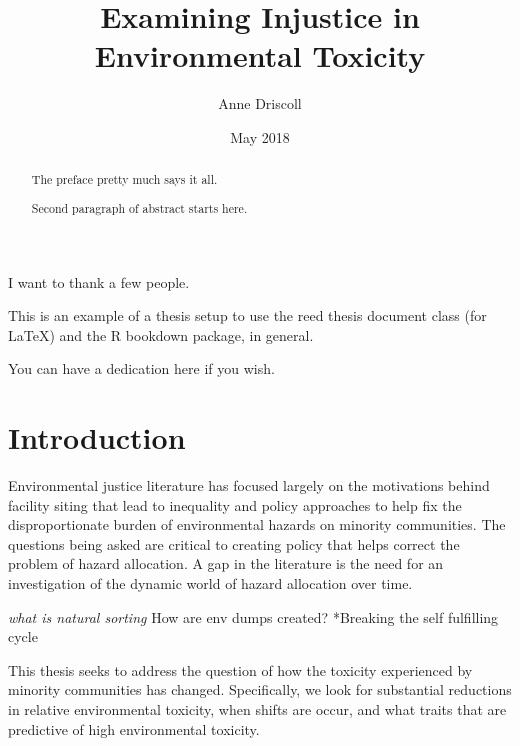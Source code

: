 \documentclass[12pt,twoside]{dukestatscithesis}
\title{Examining Injustice in Environmental Toxicity}
\author{Anne Driscoll}
\date{May 2018}
\theoremstyle{definition}
\theoremstyle{definition}
\theoremstyle{definition}
\theoremstyle{remark}
\begin{document}
  \maketitle

\frontmatter %
\pagestyle{empty} %
  \begin{acknowledgements}
    I want to thank a few people.
  \end{acknowledgements}
  \begin{preface}
    This is an example of a thesis setup to use the reed thesis document
    class (for LaTeX) and the R bookdown package, in general.
  \end{preface}
  \hypersetup{linkcolor=black}
  \setcounter{tocdepth}{2}
  \tableofcontents

  \listoftables

  \listoffigures
  \begin{abstract}
    The preface pretty much says it all. \par
    
    Second paragraph of abstract starts here.
  \end{abstract}
  \begin{dedication}
    You can have a dedication here if you wish.
  \end{dedication}
\mainmatter %
\pagestyle{fancyplain} %

\chapter*{Introduction}\label{introduction}

Environmental justice literature has focused largely on the motivations
behind facility siting that lead to inequality and policy approaches to
help fix the disproportionate burden of environmental hazards on
minority communities. The questions being asked are critical to creating
policy that helps correct the problem of hazard allocation. A gap in the
literature is the need for an investigation of the dynamic world of
hazard allocation over time.

\emph{what is natural sorting }How are env dumps created? *Breaking the
self fulfilling cycle

This thesis seeks to address the question of how the toxicity
experienced by minority communities has changed. Specifically, we look
for substantial reductions in relative environmental toxicity, when
shifts are occur, and what traits that are predictive of high
environmental toxicity.
\end{document}
